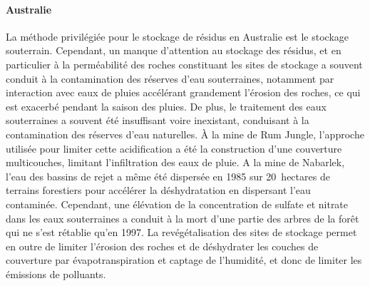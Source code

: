 \documentclass{article}
\begin{document}
\paragraph{Australie}
La méthode privilégiée pour le stockage de résidus en Australie est le stockage souterrain. Cependant, un manque d’attention au stockage des résidus, et en particulier à la perméabilité des roches constituant les sites de stockage a souvent conduit à la contamination des réserves d’eau souterraines, notamment par interaction avec eaux de pluies accélérant grandement l’érosion des roches, ce qui est exacerbé pendant la saison des pluies. De plus, le traitement des eaux souterraines a souvent été insuffisant voire inexistant, conduisant à la contamination des réserves d’eau naturelles. À la mine de Rum Jungle, l’approche utilisée pour limiter cette acidification a été la construction d’une couverture multicouches, limitant l’infiltration des eaux de pluie. A la mine de Nabarlek, l’eau des bassins de rejet a même été dispersée en 1985 sur 20~hectares de terrains forestiers pour accélérer la déshydratation en dispersant l’eau contaminée. Cependant, une élévation de la concentration de sulfate et nitrate dans les eaux souterraines a conduit à la mort d’une partie des arbres de la forêt qui ne s’est rétablie qu’en 1997.
La revégétalisation des sites de stockage permet en outre de limiter l’érosion des roches et de déshydrater les couches de couverture par évapotranspiration et captage de l’humidité, et donc de limiter les émissions de polluants.
\end{document}
